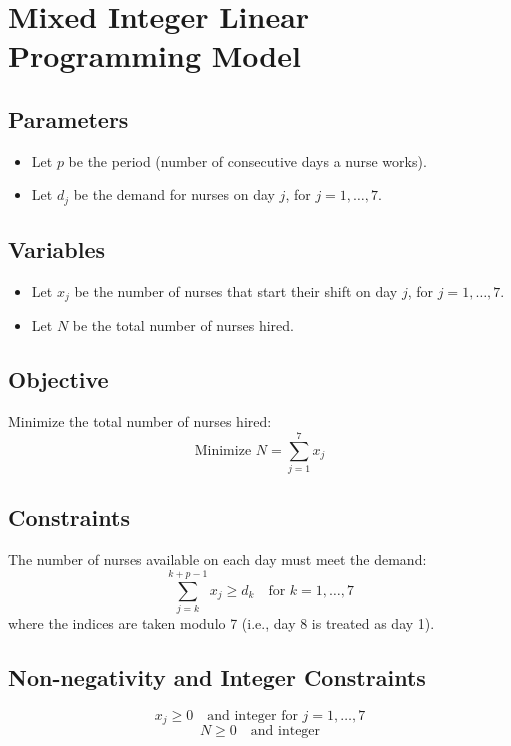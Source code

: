 \documentclass{article}
\begin{document}
\section*{Mixed Integer Linear Programming Model}

\subsection*{Parameters}
\begin{itemize}
    \item Let $p$ be the period (number of consecutive days a nurse works).
    \item Let $d_j$ be the demand for nurses on day $j$, for $j = 1, \ldots, 7$.
\end{itemize}

\subsection*{Variables}
\begin{itemize}
    \item Let $x_j$ be the number of nurses that start their shift on day $j$, for $j = 1, \ldots, 7$.
    \item Let $N$ be the total number of nurses hired.
\end{itemize}

\subsection*{Objective}
Minimize the total number of nurses hired:
\[
\text{Minimize } N = \sum_{j=1}^{7} x_j
\]

\subsection*{Constraints}
The number of nurses available on each day must meet the demand:
\[
\sum_{j=k}^{k+p-1} x_j \geq d_k \quad \text{for } k = 1, \ldots, 7
\]
where the indices are taken modulo 7 (i.e., day 8 is treated as day 1).

\subsection*{Non-negativity and Integer Constraints}
\[
x_j \geq 0 \quad \text{and integer for } j = 1, \ldots, 7
\]
\[
N \geq 0 \quad \text{and integer}
\]
\end{document}
